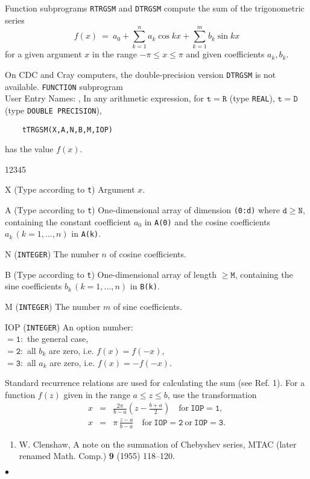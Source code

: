                               
             
\Submitter{}                                 
Function subprograms {\tt RTRGSM} and {\tt DTRGSM}
compute the sum of the trigonometric series
$$f(x) \ = \ a_0+\sum^n_{k=1} a_k\cos kx+\sum^m_{k=1} b_k\sin kx$$
for a given argument $x$ in the range $-\pi \le x \le \pi$ and given
coefficients $a_k,b_k$.
\par
On CDC and Cray computers, the double-precision version {\tt DTRGSM}
is not available.
\Structure
{\tt FUNCTION} subprogram \\
User Entry Names: , 
\Usage
In any arithmetic expression, for $\mathtt{t=R}$ (type {\tt REAL}),
$\mathtt{t=D}$ (type {\tt DOUBLE PRECISION}),
\begin{verbatim}
    tTRGSM(X,A,N,B,M,IOP)
\end{verbatim}
has the value $f(x)$.
\begin{DLtt}{12345}
\item[X] (Type according to {\tt t}) Argument $x$.
\item[A] (Type according to {\tt t}) One-dimensional array of
dimension {\tt (0:d)} where $\mathtt{d \ge N}$, containing the constant
coefficient $a_0$ in {\tt A(0)} and the cosine coefficients
$a_k\,(k=1,\ldots,n)$ in {\tt A(k)}.
\item[N] ({\tt INTEGER}) The number $n$ of cosine coefficients.
\item[B] (Type according to {\tt t}) One-dimensional array of length
$\mathtt{\ge M}$, containing the sine coefficients
$b_k\,(k=1,\ldots,n)$ in {\tt B(k)}.
\item[M] ({\tt INTEGER}) The number $m$ of sine coefficients.
\item[IOP] ({\tt INTEGER}) An option number: \\
$\mathtt{= 1:}$ the general case, \\
$\mathtt{= 2:}$ all $b_k$ are zero, i.e. $f(x)=f(-x)$,\\
$\mathtt{= 3:}$ all $a_k$ are zero, i.e. $f(x)=-f(-x)$.
\end{DLtt}
\Method
Standard recurrence relations are used for calculating the sum
(see Ref. 1).
\Notes
For a function $f(z)$ given in the range $a \le z \le b$,
use the transformation
\begin{eqnarray*}
x & = & \displaystyle \frac{2\pi}{b-a}\left(z-\frac{b+a}{2} \right)
\quad \mathrm{for} \ \mathtt{IOP=1}, \\[4mm]
x & = & \displaystyle \pi\,\frac{z-a}{b-a}
\quad \mathrm{for} \ \mathtt{IOP=2} \ \mathrm{or} \ \mathtt{IOP=3}.
\end{eqnarray*}
\Refer
\begin{enumerate}
\item W. Clenshaw, A note on the summation of Chebyshev series,
MTAC (later renamed Math. Comp.) {\bf 9} (1955) 118--120.
\end{enumerate}
$\bullet$
